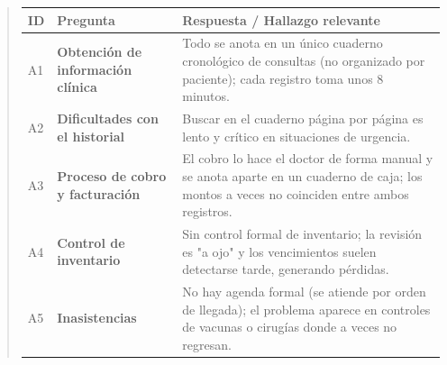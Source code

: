 \documentclass[
]{article}
\newcounter{none} %
\begin{document}
\begin{quote}
{\def\LTcaptype{none} %
\begin{longtable}[]{|
  >{\centering\arraybackslash}p{}|
  >{\raggedright\arraybackslash}p{}|
  >{\raggedright\arraybackslash}p{}|}
\hline
\begin{minipage}[b]{\linewidth}\centering
\textbf{ID}
\end{minipage} & \begin{minipage}[b]{\linewidth}\centering
\textbf{Pregunta}
\end{minipage} & \begin{minipage}[b]{\linewidth}\raggedright
\textbf{Respuesta / Hallazgo relevante}
\end{minipage} \\
\hline
\endhead
\hline
\endlastfoot
A1 & \textbf{Obtención de información clínica} &
\begin{minipage}[t]{\linewidth}\raggedright
Todo se anota en un único cuaderno cronológico de consultas (no organizado por paciente); cada registro toma unos 8 minutos.
\end{minipage} \\
\hline
A2 & \textbf{Dificultades con el historial} &
\begin{minipage}[t]{\linewidth}\raggedright
Buscar en el cuaderno página por página es lento y crítico en situaciones de urgencia.
\end{minipage} \\
\hline
A3 & \textbf{Proceso de cobro y facturación} &
\begin{minipage}[t]{\linewidth}\raggedright
El cobro lo hace el doctor de forma manual y se anota aparte en un cuaderno de caja; los montos a veces no coinciden entre ambos registros.
\end{minipage} \\
\hline
A4 & \textbf{Control de inventario} &
\begin{minipage}[t]{\linewidth}\raggedright
Sin control formal de inventario; la revisión es "a ojo" y los vencimientos suelen detectarse tarde, generando pérdidas.
\end{minipage} \\
\hline
A5 & \textbf{Inasistencias} &
\begin{minipage}[t]{\linewidth}\raggedright
No hay agenda formal (se atiende por orden de llegada); el problema aparece en controles de vacunas o cirugías donde a veces no regresan.
\end{minipage} \\

\end{longtable}}
\end{quote}
\end{document}
